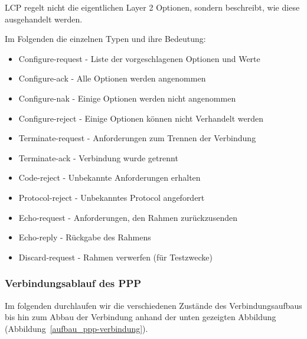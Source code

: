 \documentclass[12pt, a4paper, ngerman]{article}
\begin{document}
LCP regelt nicht die eigentlichen Layer 2 Optionen, sondern beschreibt, wie diese ausgehandelt werden. 

Im Folgenden die einzelnen Typen und ihre Bedeutung:

\begin{itemize}
	\item Configure-request	- Liste der vorgeschlagenen Optionen und Werte
	\item Configure-ack		- Alle Optionen werden angenommen
	\item	Configure-nak		- Einige Optionen werden nicht angenommen
	\item Configure-reject	- Einige Optionen können nicht Verhandelt werden
	\item Terminate-request	- Anforderungen zum Trennen der Verbindung
	\item Terminate-ack		- Verbindung wurde getrennt
	\item Code-reject		- Unbekannte Anforderungen erhalten
	\item Protocol-reject		- Unbekanntes Protocol angefordert
	\item Echo-request		- Anforderungen, den Rahmen zurückzusenden
	\item Echo-reply		- Rückgabe des Rahmens
	\item	Discard-request	- Rahmen verwerfen (für Testzwecke)
\end{itemize} 



\subsubsection{Verbindungsablauf des PPP}

Im folgenden durchlaufen wir die verschiedenen Zustände des Verbindungsaufbaus bis hin zum Abbau der Verbindung anhand der unten gezeigten Abbildung (Abbildung~\ref{aufbau_ppp-verbindung}).

 
\end{document}
